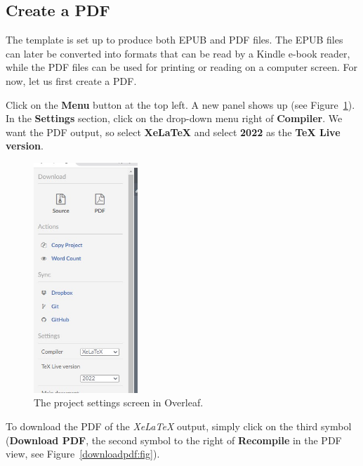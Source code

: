 \subsection{Create a PDF}\label{createpdfoutput:sec}

The template is set up to produce both EPUB and PDF files. The EPUB files can later be converted into formats that can be read by a Kindle e-book reader, while the PDF files can be used for printing or reading on a computer screen. For now, let us first create a PDF. 

Click on the \textbf{Menu} button at the top left. A new panel shows up (see Figure~\ref{projectsettings:fig}). In the \textbf{Settings} section, click on the drop-down menu right of \textbf{Compiler}. We want the PDF output, so select \textbf{XeLaTeX} and select \textbf{2022} as the \textbf{TeX Live version}.

\begin{figure}[H]\centering
\includegraphics[width=0.35\textwidth]{images/projectsettings.jpg}
\caption{The project settings screen in Overleaf.}
\label{projectsettings:fig}
\end{figure}






To download the PDF of the \textit{XeLaTeX} output, simply click on the third symbol (\textbf{Download PDF}, the second symbol to the right of \textbf{Recompile} in the PDF view, see Figure~\ref{downloadpdf:fig}).



